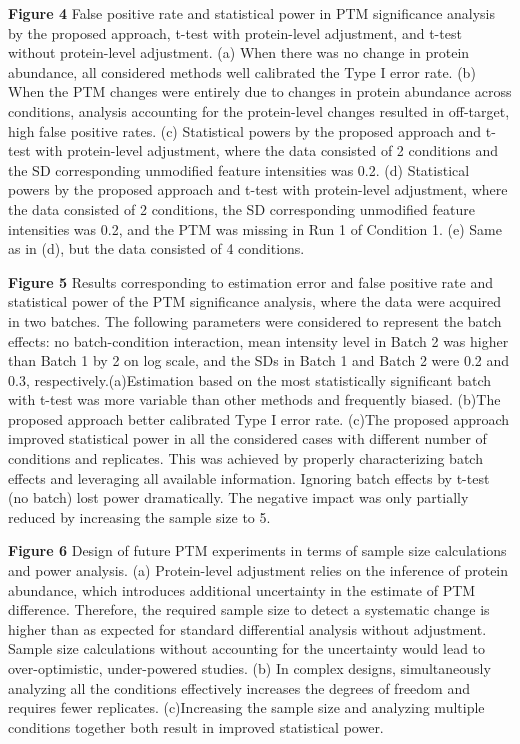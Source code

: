 \documentclass[mcp]{article}
\numberwithin{figure}{section} %
\numberwithin{table}{section}
\begin{document}
{\bf Figure 4} False positive rate and statistical power in PTM significance analysis by the proposed approach, t-test with protein-level adjustment, and t-test without protein-level adjustment. (a) When there was no change in protein abundance, all considered methods well calibrated the Type I error rate. (b) When the PTM changes were entirely due to changes in protein abundance across conditions, analysis accounting for the protein-level changes resulted in off-target, high false positive rates. (c) Statistical powers by the proposed approach and t-test with protein-level adjustment, where the data consisted of 2 conditions and the SD corresponding unmodified feature intensities was 0.2. (d) Statistical powers by the proposed approach and t-test with protein-level adjustment, where the data consisted of 2 conditions, the SD corresponding unmodified feature intensities was 0.2, and the PTM was missing in Run 1 of Condition 1. (e) Same as in (d), but the data consisted of 4 conditions.

{\bf Figure 5} Results corresponding to estimation error and false positive rate and statistical power of the PTM significance analysis, where the data were acquired in two batches. The following parameters were considered to represent the batch effects: no batch-condition interaction, mean intensity level in Batch 2 was higher than Batch 1 by 2 on log scale, and the SDs in Batch 1 and Batch 2 were 0.2 and 0.3, respectively.(a)Estimation based on the most statistically significant batch with t-test was more variable than other methods and frequently biased. (b)The proposed approach better calibrated Type I error rate. (c)The proposed approach improved statistical power in all the considered cases with different number of conditions and replicates. This was achieved by properly characterizing batch effects and leveraging all available information. Ignoring batch effects by t-test (no batch) lost power dramatically. The negative impact was only partially reduced by increasing the sample size to 5.

{\bf Figure 6} Design of future PTM experiments in terms of sample size calculations and power analysis. (a) Protein-level adjustment relies on the inference of protein abundance, which introduces additional uncertainty in the estimate of PTM difference. Therefore, the required sample size to detect a systematic change is higher than as expected for standard differential analysis without adjustment. Sample size calculations without accounting for the uncertainty would lead to over-optimistic, under-powered studies. (b) In complex designs, simultaneously analyzing all the conditions effectively increases the degrees of freedom and requires fewer replicates. (c)Increasing the sample size and analyzing multiple conditions together both result in improved statistical power.
\end{document}
